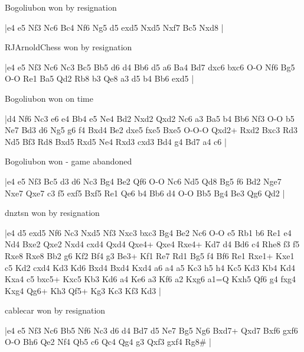 \showboard

Bogoliubon won by resignation

\makegametitle
|e4 e5 Nf3 Nc6 Bc4 Nf6 Ng5 d5 exd5 Nxd5 Nxf7 Bc5 Nxd8  |

\showboard

RJArnoldChess won by resignation

\makegametitle
|e4 e5 Nf3 Nc6 Nc3 Bc5 Bb5 d6 d4 Bb6 d5 a6 Ba4 Bd7 dxc6 bxc6 O-O Nf6 Bg5 O-O Re1 Ba5 Qd2 Rb8 b3 Qe8 a3 d5 b4 Bb6 exd5  |

\showboard

Bogoliubon won on time

\makegametitle
|d4 Nf6 Nc3 e6 e4 Bb4 e5 Ne4 Bd2 Nxd2 Qxd2 Nc6 a3 Ba5 b4 Bb6 Nf3 O-O b5 Ne7 Bd3 d6 Ng5 g6 f4 Bxd4 Be2 dxe5 fxe5 Bxe5 O-O-O Qxd2+ Rxd2 Bxc3 Rd3 Nd5 Bf3 Rd8 Bxd5 Rxd5 Ne4 Rxd3 cxd3 Bd4 g4 Bd7 a4 c6  |

\showboard

Bogoliubon won - game abandoned

\makegametitle
|e4 e5 Nf3 Bc5 d3 d6 Nc3 Bg4 Be2 Qf6 O-O Nc6 Nd5 Qd8 Bg5 f6 Bd2 Nge7 Nxe7 Qxe7 c3 f5 exf5 Bxf5 Re1 Qe6 b4 Bb6 d4 O-O Bb5 Bg4 Be3 Qg6 Qd2  |

\showboard

dnztsn won by resignation

\makegametitle
|e4 d5 exd5 Nf6 Nc3 Nxd5 Nf3 Nxc3 bxc3 Bg4 Be2 Nc6 O-O e5 Rb1 b6 Re1 e4 Nd4 Bxe2 Qxe2 Nxd4 cxd4 Qxd4 Qxe4+ Qxe4 Rxe4+ Kd7 d4 Bd6 c4 Rhe8 f3 f5 Rxe8 Rxe8 Bb2 g6 Kf2 Bf4 g3 Be3+ Kf1 Re7 Rd1 Bg5 f4 Bf6 Re1 Rxe1+ Kxe1 c5 Kd2 cxd4 Kd3 Kd6 Bxd4 Bxd4 Kxd4 a6 a4 a5 Kc3 h5 h4 Kc5 Kd3 Kb4 Kd4 Kxa4 c5 bxc5+ Kxc5 Kb3 Kd6 a4 Ke6 a3 Kf6 a2 Kxg6 a1=Q Kxh5 Qf6 g4 fxg4 Kxg4 Qg6+ Kh3 Qf5+ Kg3 Kc3 Kf3 Kd3  |

\showboard

cablecar won by resignation

\makegametitle
|e4 e5 Nf3 Nc6 Bb5 Nf6 Nc3 d6 d4 Bd7 d5 Ne7 Bg5 Ng6 Bxd7+ Qxd7 Bxf6 gxf6 O-O Bh6 Qe2 Nf4 Qb5 c6 Qc4 Qg4 g3 Qxf3 gxf4 Rg8\#  |

